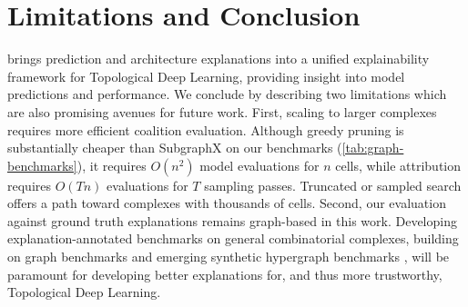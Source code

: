 \section{Limitations and Conclusion}
\label{sec:limitations}


\method brings prediction and architecture explanations into a unified explainability framework for Topological Deep Learning, providing insight into model predictions and performance. We conclude by describing two limitations which are also promising avenues for future work. First, scaling to larger complexes requires more efficient coalition evaluation. Although greedy pruning is substantially cheaper than SubgraphX on our benchmarks
(\cref{tab:graph-benchmarks}), it requires $O(n^{2})$ model evaluations for $n$ cells, while attribution requires $O(Tn)$ evaluations for $T$ sampling passes. Truncated or sampled search offers a path toward complexes with thousands of cells. Second, our evaluation against ground truth explanations remains graph-based in this work. Developing explanation-annotated benchmarks on general combinatorial complexes, building on graph benchmarks and emerging synthetic hypergraph benchmarks \citep{su2024shypx}, will be paramount for developing better explanations for, and thus more trustworthy, Topological Deep Learning.
